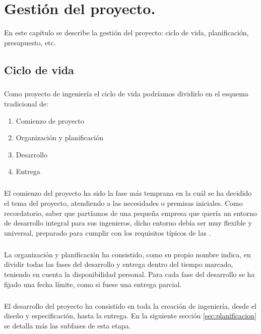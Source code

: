 \chapter{Gestión del proyecto.}\label{sec:gestion}

En este capítulo se describe la gestión del proyecto: ciclo de vida, planificación,
presupuesto, etc.

\section{Ciclo de vida}

\paragraph{}Como proyecto de ingeniería el ciclo de vida podríamos dividirlo en el
esquema tradicional de:

\begin{enumerate}
  \item Comienzo de proyecto
  \item Organización y planificación
  \item Desarrollo
  \item Entrega
\end{enumerate}

\paragraph{}El comienzo del proyecto ha sido la fase más temprana en la cuál se ha
decidido el tema del proyecto, atendiendo a las necesidades o premisas iniciales. Como
recordatorio, saber que partíamos de una pequeña empresa que quería un entorno de desarrollo
integral para sus ingenieros, dicho entorno debía ser muy flexible y universal, preparado
para cumplir con los requisitos típicos de las .

\paragraph{}La organización y planificación ha consistido, como su propio nombre indica,
en dividir todas las fases del desarrollo y entrega dentro del tiempo marcado, teniendo
en cuenta la disponibilidad personal. Para cada fase del desarrollo se ha fijado una
fecha límite, como si fuese una entrega parcial.

\paragraph{}El desarrollo del proyecto ha consistido en toda la creación de ingeniería,
desde el diseño y especificación, hasta la entrega. En la siguiente sección \ref{sec:planificacion}
se detalla más las subfases de esta etapa.

